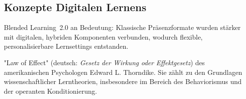 \subsection{Konzepte Digitalen Lernens}




Blended Learning~2.0 an Bedeutung: Klassische Präsenzformate wurden stärker mit digitalen, hybriden Komponenten verbunden, wodurch flexible, personalisierbare Lernsettings entstanden.\parencite{bonk2020}





"Law of Effect" (deutsch: \textit{Gesetz der Wirkung oder Effektgesetz}) des amerikanischen Psychologen Edward L. Thorndike. Sie zählt zu den Grundlagen wissenschaftlicher Lerntheorien, insbesondere im Bereich des Behaviorismus und der operanten Konditionierung.
